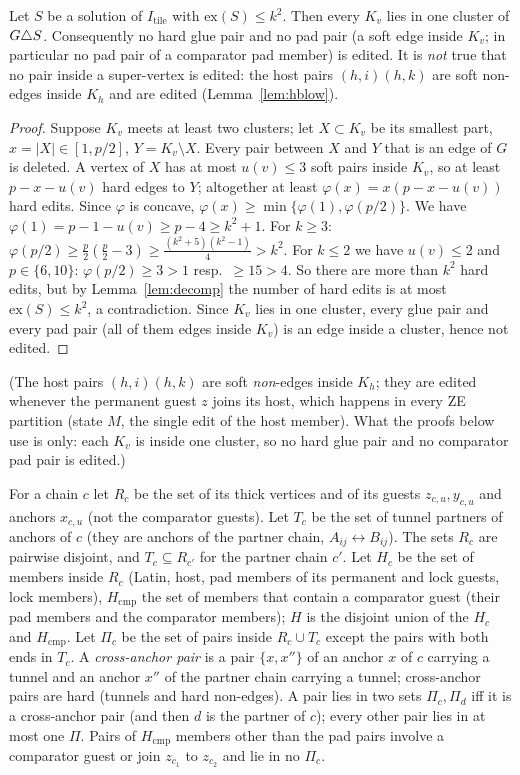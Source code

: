 \begin{lemma}\label{lem:hsplit}
Let $S$ be a solution of $I_{\mathrm{tile}}$ with $\mathrm{ex}(S)\le k^2$. Then every $K_v$ lies in one cluster of $G\triangle S$. Consequently no hard glue pair and no pad pair (a soft edge inside $K_v$; in particular no pad pair of a comparator pad member) is edited. It is \emph{not} true that no pair inside a super-vertex is edited: the host pairs $(h,i)(h,k)$ are soft non-edges inside $K_h$ and are edited (Lemma~\ref{lem:hblow}).
\end{lemma}
\begin{proof}
Suppose $K_v$ meets at least two clusters; let $X\subset K_v$ be its smallest part, $x=|X|\in[1,p/2]$, $Y=K_v\setminus X$. Every pair between $X$ and $Y$ that is an edge of $G$ is deleted. A vertex of $X$ has at most $u(v)\le3$ soft pairs inside $K_v$, so at least $p-x-u(v)$ hard edges to $Y$; altogether at least $\varphi(x)=x(p-x-u(v))$ hard edits. Since $\varphi$ is concave, $\varphi(x)\ge\min\{\varphi(1),\varphi(p/2)\}$. We have $\varphi(1)=p-1-u(v)\ge p-4\ge k^2+1$. For $k\ge3$: $\varphi(p/2)\ge\frac p2(\frac p2-3)\ge\frac{(k^2+5)(k^2-1)}4>k^2$. For $k\le2$ we have $u(v)\le2$ and $p\in\{6,10\}$: $\varphi(p/2)\ge3>1$ resp.\ $\ge15>4$. So there are more than $k^2$ hard edits, but by Lemma~\ref{lem:decomp} the number of hard edits is at most $\mathrm{ex}(S)\le k^2$, a contradiction. Since $K_v$ lies in one cluster, every glue pair and every pad pair (all of them edges inside $K_v$) is an edge inside a cluster, hence not edited.
\end{proof}
(The host pairs $(h,i)(h,k)$ are soft \emph{non}-edges inside $K_h$; they are edited whenever the permanent guest $z$ joins its host, which happens in every ZE partition (state $M$, the single edit of the host member). What the proofs below use is only: each $K_v$ is inside one cluster, so no hard glue pair and no comparator pad pair is edited.)

 For a chain $c$ let $R_c$ be the set of its thick vertices and of its guests $z_{c,u},y_{c,u}$ and anchors $x_{c,u}$ (not the comparator guests). Let $T_c$ be the set of tunnel partners of anchors of $c$ (they are anchors of the partner chain, $A_{ij}\leftrightarrow B_{ij}$). The sets $R_c$ are pairwise disjoint, and $T_c\subseteq R_{c'}$ for the partner chain $c'$. Let $H_c$ be the set of members inside $R_c$ (Latin, host, pad members of its permanent and lock guests, lock members), $H_{\mathrm{cmp}}$ the set of members that contain a comparator guest (their pad members and the comparator members); $H$ is the disjoint union of the $H_c$ and $H_{\mathrm{cmp}}$. Let $\Pi_c$ be the set of pairs inside $R_c\cup T_c$ except the pairs with both ends in $T_c$. A \emph{cross-anchor pair} is a pair $\{x,x''\}$ of an anchor $x$ of $c$ carrying a tunnel and an anchor $x''$ of the partner chain carrying a tunnel; cross-anchor pairs are hard (tunnels and hard non-edges). A pair lies in two sets $\Pi_c,\Pi_{d}$ iff it is a cross-anchor pair (and then $d$ is the partner of $c$); every other pair lies in at most one $\Pi$. Pairs of $H_{\mathrm{cmp}}$ members other than the pad pairs involve a comparator guest or join $z_{c_1}$ to $z_{c_2}$ and lie in no $\Pi_c$.

